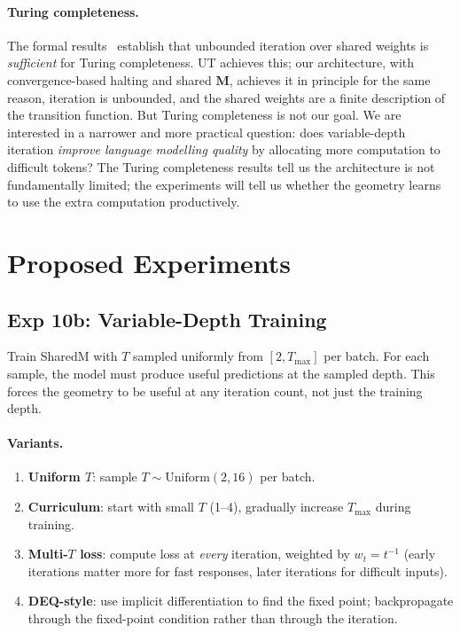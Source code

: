 \documentclass[11pt, a4paper]{article}
\newcommand{\M}{\mathbf{M}}
\theoremstyle{plain}
\theoremstyle{definition}
\theoremstyle{remark}
\begin{document}
\paragraph{Turing completeness.}
The formal results~\cite{perez2019turing, perez2021attention} establish that unbounded iteration over shared weights is \emph{sufficient} for Turing completeness.
UT achieves this; our architecture, with convergence-based halting and shared $\M$, achieves it in principle for the same reason, iteration is unbounded, and the shared weights are a finite description of the transition function.
But Turing completeness is not our goal.
We are interested in a narrower and more practical question: does variable-depth iteration \emph{improve language modelling quality} by allocating more computation to difficult tokens?
The Turing completeness results tell us the architecture is not fundamentally limited; the experiments will tell us whether the geometry learns to use the extra computation productively.

\section{Proposed Experiments}

\subsection{Exp 10b: Variable-Depth Training}

Train SharedM with $T$ sampled uniformly from $[2, T_{\max}]$ per batch.
For each sample, the model must produce useful predictions at the sampled depth.
This forces the geometry to be useful at any iteration count, not just the training depth.

\paragraph{Variants.}
\begin{enumerate}[nosep]
    \item \textbf{Uniform $T$}: sample $T \sim \text{Uniform}(2, 16)$ per batch.
    \item \textbf{Curriculum}: start with small $T$ (1--4), gradually increase $T_{\max}$ during training.
    \item \textbf{Multi-$T$ loss}: compute loss at \emph{every} iteration, weighted by $w_t = t^{-1}$ (early iterations matter more for fast responses, later iterations for difficult inputs).
    \item \textbf{DEQ-style}: use implicit differentiation to find the fixed point; backpropagate through the fixed-point condition rather than through the iteration.
\end{enumerate}
\end{document}
